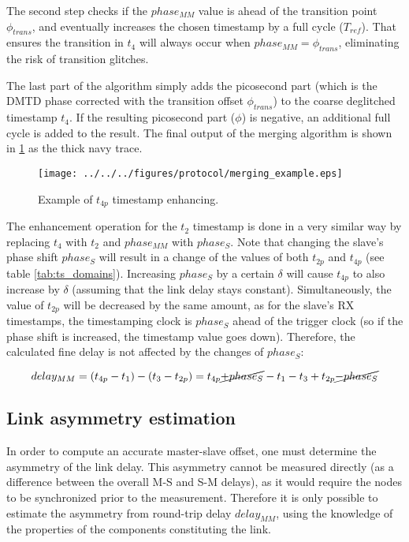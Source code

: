 The second step checks if the $phase_{MM}$ value is ahead of the transition
point $\phi_{trans}$, and eventually increases the chosen timestamp by a full
cycle ($T_{ref}$). That ensures the transition in $t_{4}$ will always occur
when $phase_{MM} = \phi_{trans}$, eliminating the risk of transition glitches.

The last part of the algorithm simply adds the picosecond part (which is
the DMTD phase corrected with the transition offset $\phi_{trans}$) to
the coarse deglitched timestamp $t_{4}$. If the resulting picosecond part
($\phi$) is negative, an additional full cycle is added to the result. The
final output of the merging algorithm is shown in \ref{fig:merging_example}
as the thick navy trace.
 \begin{figure}[ht!]
  \centering
  \texttt{[image: ../../../figures/protocol/merging\_example.eps]}
  \caption{Example of $t_{4p}$ timestamp enhancing.}
  \label{fig:merging_example}
\end{figure}
The enhancement operation for the $t_{2}$ timestamp is done in a very
similar way by replacing $t_{4}$ with $t_{2}$ and $phase_{MM}$ with
$phase_{S}$. Note that changing the slave's phase shift $phase_{S}$ will
result in a change of the values of both $t_{2p}$ and $t_{4p}$ (see table
\ref{tab:ts_domains}). Increasing $phase_{S}$ by a certain $\delta$ will
cause $t_{4p}$ to also increase by $\delta$ (assuming that the link delay
stays constant). Simultaneously, the value of $t_{2p}$ will be decreased by
the same amount, as for the slave's RX timestamps, the timestamping clock is
$phase_{S}$ ahead of the trigger clock (so if the phase shift is increased,
the timestamp value goes down). Therefore, the calculated fine delay is not
affected by the changes of $phase_{S}$:

\begin{equation}
\label{eq:ptp_precise2}
delay_{MM} = (t_{4p} - t_{1}) - (t_{3} - t_{2p}) = t_{4p} \cancel{+ phase_{S}}
- t_{1} - t_{3} + t_{2p} \cancel{-phase_{S}}
\end{equation}


\subsection{Link asymmetry estimation}
\label{s:asymmetry}
In order to compute an accurate master-slave offset, one must determine the
asymmetry of the link delay. This asymmetry cannot be measured directly (as
a difference between the overall M-S and S-M delays), as it would require
the nodes to be synchronized prior to the measurement. Therefore it is
only possible to estimate the asymmetry from round-trip delay $delay_{MM}$,
using the knowledge of the properties of the components constituting the link.

